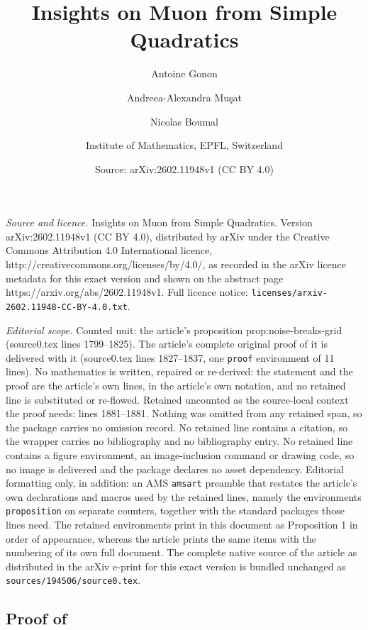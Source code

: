 \documentclass[10pt,a4paper]{amsart}
\title{Insights on Muon from Simple Quadratics}
\author{Antoine Gonon \and Andreea-Alexandra Muşat \and Nicolas Boumal \and \small Institute of Mathematics, EPFL, Switzerland}
\date{Source: arXiv:2602.11948v1 (CC BY 4.0)}
\begin{document}
\maketitle

\noindent\emph{Source and licence.} Insights on Muon from Simple Quadratics. Version arXiv:2602.11948v1 (CC BY 4.0), distributed by arXiv under the Creative Commons Attribution 4.0 International licence, http://creativecommons.org/licenses/by/4.0/, as recorded in the arXiv licence metadata for this exact version and shown on the abstract page https://arxiv.org/abs/2602.11948v1. Full licence notice: \texttt{licenses/arxiv-2602.11948-CC-BY-4.0.txt}.\par\smallskip

\noindent\textit{Editorial scope.} Counted unit: the article's proposition prop:noise-breaks-grid (source0.tex lines 1799--1825). The article's complete original proof of it is delivered with it (source0.tex lines 1827--1837, one \texttt{proof} environment of 11 lines). No mathematics is written, repaired or re-derived: the statement and the proof are the article's own lines, in the article's own notation, and no retained line is substituted or re-flowed.  Retained uncounted as the source-local context the proof needs: lines 1881--1881.  Nothing was omitted from any retained span, so the package carries no omission record.  No retained line contains a citation, so the wrapper carries no bibliography and no bibliography entry.  No retained line contains a figure environment, an image-inclusion command or drawing code, so no image is delivered and the package declares no asset dependency.  Editorial formatting only, in addition: an AMS \texttt{amsart} preamble that restates the article's own declarations and macros used by the retained lines, namely the environments \texttt{proposition} on separate counters, together with the standard packages those lines need.  The retained environments print in this document as Proposition 1 in order of appearance, whereas the article prints the same items with the numbering of its own full document.  The complete native source of the article as distributed in the arXiv e-print for this exact version is bundled unchanged as \texttt{sources/194506/source0.tex}.
\subsection{Proof of } \label{sec:noise-breaks-grid}
\end{document}
